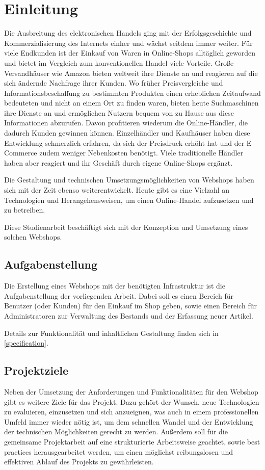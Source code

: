 \section{Einleitung} \thispagestyle{nomarkstyle}
Die Ausbreitung des elektronischen Handels ging mit der Erfolgsgeschichte und Kommerzialisierung des Internets einher und wächst seitdem immer weiter.
Für viele Endkunden ist der Einkauf von Waren in Online-Shops alltäglich geworden und bietet im Vergleich zum konventionellen Handel viele Vorteile.
Große Versandhäuser wie Amazon bieten weltweit ihre Dienste an und reagieren auf die sich ändernde Nachfrage ihrer Kunden.
Wo früher Preisvergleiche und Informationsbeschaffung zu bestimmten Produkten einen erheblichen Zeitaufwand bedeuteten und nicht an einem Ort zu finden waren, bieten heute Suchmaschinen ihre Dienste an und ermöglichen Nutzern bequem von zu Hause aus diese Informationen abzurufen.
Davon profitieren wiederum die Online-Händler, die dadurch Kunden gewinnen können.
Einzelhändler und Kaufhäuser haben diese Entwicklung schmerzlich erfahren, da sich der Preisdruck erhöht hat und der E-Commerce zudem weniger Nebenkosten benötigt.
Viele traditionelle Händler haben aber reagiert und ihr Geschäft durch eigene Online-Shops ergänzt. \cite{Riehm2004}

Die Gestaltung und technischen Umsetzungsmöglichkeiten von Webshops haben sich mit der Zeit ebenso weiterentwickelt.
Heute gibt es eine Vielzahl an Technologien und Herangehensweisen, um einen Online-Handel aufzusetzen und zu betreiben.

Diese Studienarbeit beschäftigt sich mit der Konzeption und Umsetzung eines solchen Webshops.

\subsection{Aufgabenstellung}
Die Erstellung eines Webshops mit der benötigten Infrastruktur ist die Aufgabenstellung der vorliegenden Arbeit.
Dabei soll es einen Bereich für Benutzer (oder Kunden) für den Einkauf im Shop geben, sowie einen Bereich für Administratoren zur Verwaltung des Bestands und der Erfassung neuer Artikel.

Details zur Funktionalität und inhaltlichen Gestaltung finden sich in \cref{specification}.
\subsection{Projektziele}
Neben der Umsetzung der Anforderungen und Funktionalitäten für den Webshop gibt es weitere Ziele für das Projekt.
Dazu gehört der Wunsch, neue Technologien zu evaluieren, einzusetzen und sich anzueignen, was auch in einem professionellen Umfeld immer wieder nötig ist, um dem schnellen Wandel und der Entwicklung der technischen Möglichkeiten gerecht zu werden.
Außerdem soll für die gemeinsame Projektarbeit auf eine strukturierte Arbeitsweise geachtet, sowie best practices herausgearbeitet werden, um einen möglichst reibungslosen und effektiven Ablauf des Projekts zu gewährleisten.
